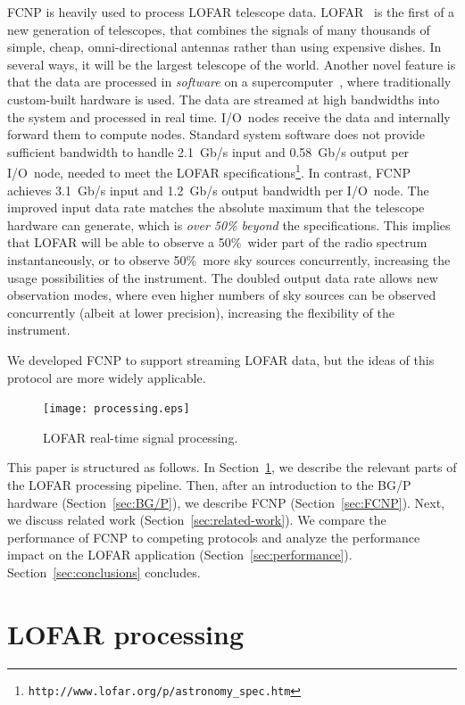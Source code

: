 \documentclass[journal]{IEEEtran}
\begin{document}
FCNP is heavily used to process LOFAR telescope data.
LOFAR~\cite{Butcher:04,deVos:09} is the first of a new generation of
telescopes, that
combines the signals of many thousands of simple, cheap, omni-directional
antennas rather than using expensive dishes.
In several ways, it will be the largest telescope of the world.
Another novel feature is that the data are processed in \emph{software\/} on a
supercomputer~\cite{Romein:06}, where traditionally custom-built hardware is
used.
The data are streamed at high bandwidths into the system and processed in real
time.
I/O~nodes receive the data and internally forward them to compute nodes.
Standard system software does not provide sufficient bandwidth to handle
2.1~Gb/s input and 0.58~Gb/s output per I/O~node, needed to meet the LOFAR
specifications\footnote{\texttt{http://www.lofar.org/p/astronomy\_spec.htm}}.
In contrast, FCNP achieves 3.1~Gb/s input and 1.2~Gb/s output bandwidth per
I/O~node.
The improved input data rate matches the absolute maximum that the telescope
hardware can generate, which is \emph{over 50\% beyond\/} the specifications.
This implies that LOFAR will be able to observe a 50\%~wider part of the radio
spectrum instantaneously, or to observe 50\%~more sky sources concurrently,
increasing the usage possibilities of the instrument.
The doubled output data rate allows new observation modes, where even higher
numbers of sky sources can be observed concurrently (albeit at lower
precision), increasing the flexibility of the instrument.

We developed FCNP to support streaming LOFAR data,
but the ideas of this protocol are more widely applicable.

\addtocounter{figure}{1}
\begin{figure}[t]
\texttt{[image: processing.eps]}
\caption{LOFAR real-time signal processing.}
\label{fig:processing}
\end{figure}

This paper is structured as follows.
In Section~\ref{sec:LOFAR}, we describe the relevant parts of the LOFAR
processing pipeline.
Then, after an introduction to the BG/P
hardware (Section~\ref{sec:BG/P}), we describe FCNP (Section~\ref{sec:FCNP}).
Next, we discuss related work (Section~\ref{sec:related-work}).
We compare the performance of FCNP to competing protocols and analyze the
performance impact on the LOFAR application (Section~\ref{sec:performance}).
Section~\ref{sec:conclusions} concludes.



\section{LOFAR processing}
\label{sec:LOFAR}
\end{document}
